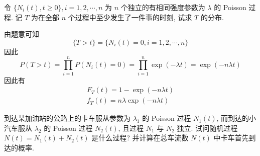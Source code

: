 \documentclass[boxes]{homework}
\begin{document}
\begin{problem}
    令 $\{N_i(t), t\geq 0\}, i = 1,2,\cdots, n$ 为 $n$ 个独立的有相同强度参数为 $\lambda$ 的 Poisson 过程. 记 $T$ 为在全部 $n$ 个过程中至少发生了一件事的时刻, 试求 $T$ 的分布.
\end{problem}
\begin{solution}
    由题意可知
    \begin{equation}
        \{T>t\} = \{N_i(t) = 0, i = 1, 2, \cdots, n\}
    \end{equation}
    因此 
    \begin{equation}
        P(T>t) = \prod_{i = 1}^n P(N_i(t) = 0) = \prod_{i = 1}^n \exp(-\lambda t) = \exp(-n\lambda t)
    \end{equation}
    因此有
    \begin{gather}
        F_T(t) = 1 - \exp(-n\lambda t)\\
        f_T(t) = n\lambda \exp(-n\lambda t)
    \end{gather}
\end{solution}
\begin{problem}
    到达某加油站的公路上的卡车服从参数为 $\lambda_1$ 的 Poisson 过程 $N_1(t)$, 而到达的小汽车服从 $\lambda_2$ 的 Poisson 过程 $N_2(t)$, 且过程 $N_1$ 与 $N_2$ 独立. 试问随机过程 $N(t)=N_1(t)+N_2(t)$ 是什么过程? 并计算在总车流数 $N(t)$ 中卡车首先到达的概率.
\end{problem}
\end{document}

